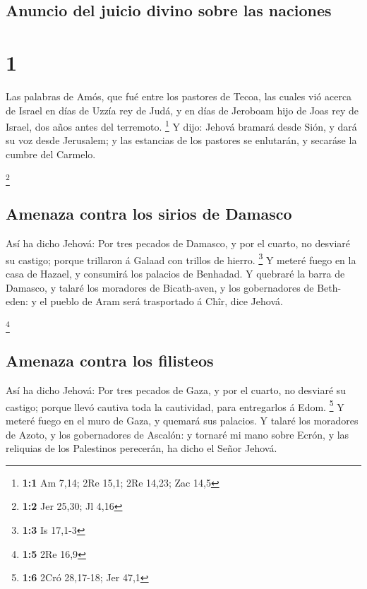 \hypertarget{anuncio-del-juicio-divino-sobre-las-naciones}{%
\subsection{Anuncio del juicio divino sobre las
naciones}\label{anuncio-del-juicio-divino-sobre-las-naciones}}

\hypertarget{section}{%
\section{1}\label{section}}

 Las palabras de Amós, que fué entre los pastores de
Tecoa, las cuales vió acerca de Israel en días de Uzzía rey de Judá, y
en días de Jeroboam hijo de Joas rey de Israel, dos años antes del
terremoto. \footnote{\textbf{1:1} Am 7,14; 2Re 15,1; 2Re 14,23; Zac 14,5}
 Y dijo: Jehová bramará desde Sión, y dará su voz desde
Jerusalem; y las estancias de los pastores se enlutarán, y secaráse la
cumbre del Carmelo.

\footnote{\textbf{1:2} Jer 25,30; Jl 4,16}

\hypertarget{amenaza-contra-los-sirios-de-damasco}{%
\subsection{Amenaza contra los sirios de
Damasco}\label{amenaza-contra-los-sirios-de-damasco}}

 Así ha dicho Jehová: Por tres pecados de Damasco, y por
el cuarto, no desviaré su castigo; porque trillaron á Galaad con trillos
de hierro. \footnote{\textbf{1:3} Is 17,1-3}  Y meteré
fuego en la casa de Hazael, y consumirá los palacios de Benhadad.
 Y quebraré la barra de Damasco, y talaré los moradores de
Bicath-aven, y los gobernadores de Beth-eden: y el pueblo de Aram será
trasportado á Chîr, dice Jehová.

\footnote{\textbf{1:5} 2Re 16,9}

\hypertarget{amenaza-contra-los-filisteos}{%
\subsection{Amenaza contra los
filisteos}\label{amenaza-contra-los-filisteos}}

 Así ha dicho Jehová: Por tres pecados de Gaza, y por el
cuarto, no desviaré su castigo; porque llevó cautiva toda la cautividad,
para entregarlos á Edom. \footnote{\textbf{1:6} 2Cró 28,17-18; Jer 47,1}
 Y meteré fuego en el muro de Gaza, y quemará sus
palacios.  Y talaré los moradores de Azoto, y los
gobernadores de Ascalón: y tornaré mi mano sobre Ecrón, y las reliquias
de los Palestinos perecerán, ha dicho el Señor Jehová.

